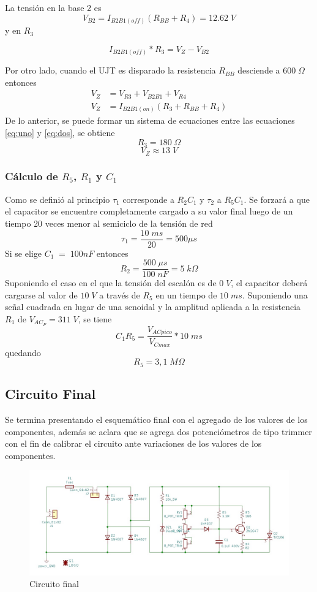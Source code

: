 \documentclass{article}
\begin{document}
La tensión en la base 2 es
\[ V_{B2} = I_{B2B1(off)} (R_{BB} + R_4) = 12.62 \; V \]
y en $R_3$

\begin{equation}
I_{B2B1(off)} * R_3 = V_Z - V_{B2}  \label{eq:uno}
\end{equation}

Por otro lado, cuando el UJT es disparado la resistencia $R_{BB}$ desciende a $600 \; \Omega$ entonces
\begin{align}
V_Z &= V_{R3} + V_{B2B1} + V_{R4} \nonumber \\
V_Z &= I_{B2B1(on)} (R_3 + R_{BB} + R_4) \label{eq:dos}
\end{align}
%
De lo anterior, se puede formar un sistema de ecuaciones entre las ecuaciones \ref{eq:uno} y \ref{eq:dos}, se obtiene
\[ R_3 = 180 \; \Omega \]
\[ V_Z \approx 13 \; V\]
%
\subsubsection{Cálculo de $R_5$, $R_1$ y $C_1$}
Como se definió al principio $\tau_1$ corresponde a $R_2C_1$ y $\tau_2$ a $R_5C_1$. Se forzará a que el capacitor se encuentre completamente cargado a su valor final luego de un tiempo 20 veces menor al semiciclo de la tensión de red
\[ \tau_1 = \frac{10 \; ms}{20} = 500 \mu s \]
Si se elige $C_1 \; = \; 100nF$ entonces
\[ R_2 = \frac{500 \; \mu s}{100 \; nF} = 5 \; k \Omega \]
Suponiendo el caso en el que la tensión del escalón es de $0 \; V$, el capacitor deberá cargarse al valor de $10 \; V$ a través de $R_5$ en un tiempo de $10 \; ms$. Suponiendo una señal cuadrada en lugar de una senoidal y la amplitud aplicada a la resistencia $R_1$ de $V_{AC_P} = 311 \; V $, se tiene 
%
\[ C_1R_5 = \frac{V_{ACpico}}{V_{C max}} * 10 \; ms \]
quedando
\[ R_5 = 3,1 \; M \Omega \]

\subsection{Circuito Final}
Se termina presentando el esquemático final con el agregado de los valores de los componentes, además se aclara que se agrega dos potenciómetros de tipo trimmer con el fin de calibrar el circuito ante variaciones de los valores de los componentes.
\begin{figure}[h]
 \begin{center}
	\includegraphics[width=\textwidth]{imagenes/fig4.jpg} 
	\caption{Circuito final}\label{fig:fig4}
 \end{center}
\end{figure}
\end{document}
